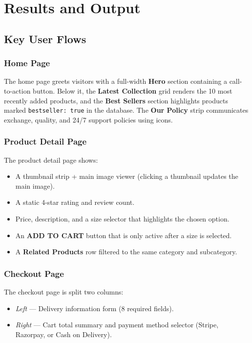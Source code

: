 \documentclass[12pt,a4paper]{report}
\begin{document}
\chapter{Results and Output}

\section{Key User Flows}

\subsection{Home Page}
The home page greets visitors with a full-width \textbf{Hero} section containing a call-to-action
button.
Below it, the \textbf{Latest Collection} grid renders the 10 most recently added products, and the
\textbf{Best Sellers} section highlights products marked \texttt{bestseller: true} in the database.
The \textbf{Our Policy} strip communicates exchange, quality, and 24/7 support policies using icons.

\subsection{Product Detail Page}
The product detail page shows:
\begin{itemize}[leftmargin=*]
  \item A thumbnail strip + main image viewer (clicking a thumbnail updates the main image).
  \item A static 4-star rating and review count.
  \item Price, description, and a size selector that highlights the chosen option.
  \item An \textbf{ADD TO CART} button that is only active after a size is selected.
  \item A \textbf{Related Products} row filtered to the same category and subcategory.
\end{itemize}

\subsection{Checkout Page}
The checkout page is split two columns:
\begin{itemize}[leftmargin=*]
  \item \textit{Left} — Delivery information form (8 required fields).
  \item \textit{Right} — Cart total summary and payment method selector
        (Stripe, Razorpay, or Cash on Delivery).
\end{itemize}
\end{document}
